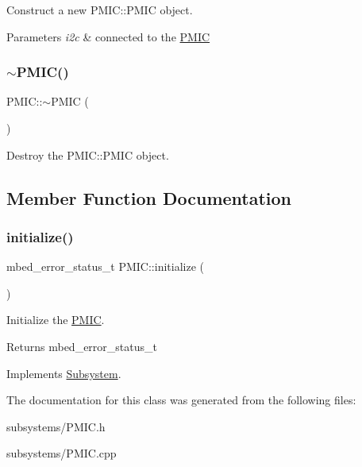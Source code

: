 Construct a new P\+M\+I\+C\+::\+P\+M\+IC object. 


\begin{DoxyParams}{Parameters}
{\em i2c} & connected to the \mbox{\hyperlink{class_p_m_i_c}{P\+M\+IC}} \\
\hline
\end{DoxyParams}
\mbox{\label{class_p_m_i_c_a68ddf66e3dab8a38dac9f026cfbb2b30}} 
\subsubsection{\texorpdfstring{$\sim$PMIC()}{~PMIC()}}
{\footnotesize\ttfamily P\+M\+I\+C\+::$\sim$\+P\+M\+IC (\begin{DoxyParamCaption}{ }\end{DoxyParamCaption})}



Destroy the P\+M\+I\+C\+::\+P\+M\+IC object. 



\subsection{Member Function Documentation}
\mbox{\label{class_p_m_i_c_ae899cdd3d66ecef345c748f9c42b5399}} 
\subsubsection{\texorpdfstring{initialize()}{initialize()}}
{\footnotesize\ttfamily mbed\+\_\+error\+\_\+status\+\_\+t P\+M\+I\+C\+::initialize (\begin{DoxyParamCaption}{ }\end{DoxyParamCaption})\hspace{0.3cm}{\ttfamily [virtual]}}



Initialize the \mbox{\hyperlink{class_p_m_i_c}{P\+M\+IC}}. 

\begin{DoxyReturn}{Returns}
mbed\+\_\+error\+\_\+status\+\_\+t 
\end{DoxyReturn}


Implements \mbox{\hyperlink{class_subsystem_afa43e7c1c8b49e514b944f517d4dc905}{Subsystem}}.



The documentation for this class was generated from the following files\+:\begin{DoxyCompactItemize}
\item 
subsystems/P\+M\+I\+C.\+h\item 
subsystems/P\+M\+I\+C.\+cpp\end{DoxyCompactItemize}
